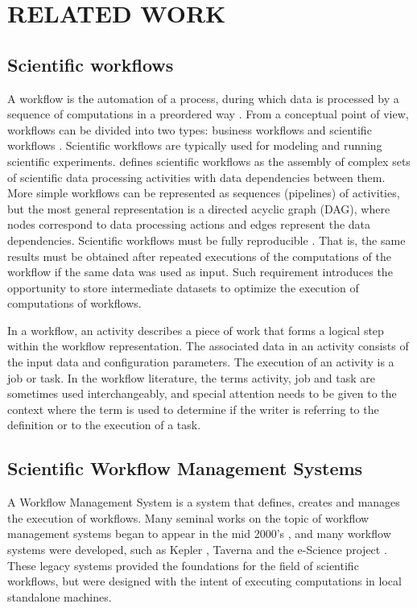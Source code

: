 \chapter{RELATED WORK}
\label{chap:related}
\section{Scientific workflows}
A workflow is the automation of a process, during which data is processed by a sequence of computations in a preordered way \citep{liu2015survey}. From a conceptual point of view, workflows can be divided into two types: business workflows and scientific workflows \citep{hollingsworth1995workflow, taylor2014workflows}. Scientific workflows are typically used for modeling and running scientific experiments. \cite{taylor2014workflows} defines scientific workflows as the assembly of complex sets of scientific data processing activities with data dependencies between them. More simple workflows can be represented as sequences (pipelines) of activities, but the most general representation is a directed acyclic graph (DAG), where nodes correspond to data processing actions and edges represent the data dependencies.  Scientific workflows must be fully reproducible \citep{barker2007scientific}. That is, the same results must be obtained after repeated executions of the computations of the workflow if the same data was used as input. Such requirement introduces the opportunity to store intermediate datasets to optimize the execution of computations of workflows.

In a workflow, an activity describes a piece of work that forms a logical step within the workflow representation.  The associated data in an activity consists of the input data and configuration parameters.  The execution of an activity is a job or task. In the workflow literature, the terms activity, job and task are sometimes used interchangeably, and special attention needs to be given to the context where the term is used to determine if the writer is referring to the definition or to the execution of a task.
 
\section{Scientific Workflow Management Systems}
A Workflow Management System is a system that defines, creates and manages the execution of workflows. Many seminal works on the topic of workflow management systems began to appear in the mid 2000's \citep[e.g.]{yu2005taxonomy, fox2006special, gil2007examining}, and many workflow systems were developed, such as Kepler \citep{altintas2004kepler}, Taverna \citep{oinn2006taverna} and the e-Science project \citep{deelman2009workflows}. These legacy systems provided the foundations for the field of scientific workflows, but were designed with the intent of executing computations in local standalone machines.

